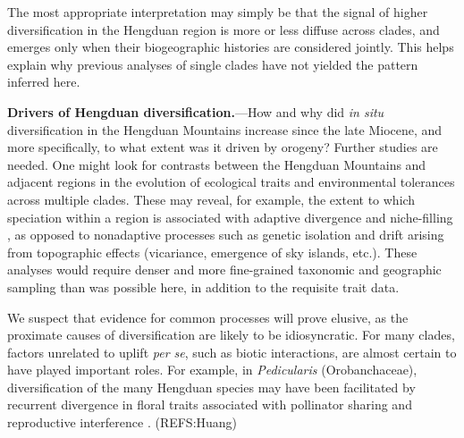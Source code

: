The most appropriate interpretation may simply be that the signal of higher diversification in the Hengduan region is more or less diffuse across clades, and emerges only when their biogeographic histories are considered jointly. This helps explain why previous analyses of single clades have not yielded the pattern inferred here.

\textbf{Drivers of Hengduan diversification.}---How and why did \textit{in situ} diversification in the Hengduan Mountains increase since the late Miocene, and more specifically, to what extent was it driven by orogeny? Further studies are needed. One might look for contrasts between the Hengduan Mountains and adjacent regions in the evolution of ecological traits and environmental tolerances \citep[e.g.,][]{liu2016} across multiple clades. These may reveal, for example, the extent to which speciation within a region is associated with adaptive divergence and niche-filling \citep{price2014}, as opposed to nonadaptive processes such as genetic isolation and drift arising from topographic effects (vicariance, emergence of sky islands, etc.). These analyses would require denser and more fine-grained taxonomic and geographic sampling than was possible here, in addition to the requisite trait data.


We suspect that evidence for common processes will prove elusive, as the proximate causes of diversification are likely to be idiosyncratic. For many clades, factors unrelated to uplift \emph{per se}, such as biotic interactions, are almost certain to have played important roles. For example, in \emph{Pedicularis} (Orobanchaceae), diversification of the many Hengduan species may have been facilitated by recurrent divergence in floral traits associated with pollinator sharing and reproductive interference \citep[e.g.,][]{eaton2012}. (REFS:Huang)

